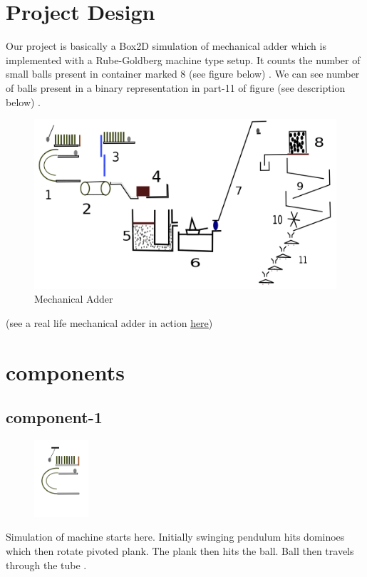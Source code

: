 \documentclass{article}
\begin{document}
\section{Project Design}
Our project is basically a Box2D simulation of mechanical adder which is implemented with a Rube-Goldberg machine type setup. It counts the number of small balls present in container marked 8 (see figure below) . We can see number of balls present in a binary representation in part-11 of figure (see description below) .
\begin{figure}[h]
  \begin{center}
    \includegraphics[width=1\textwidth]{projectfinalfinal}
  \end{center}
  \caption{Mechanical Adder}
\end{figure}

(see a real life mechanical adder in action \href{https://www.youtube.com/watch?v=GcDshWmhF4A}{here}\cite{youtube})

\newpage

\section{components}

\subsection{component-1}

\begin{figure}
    \centering
    \vspace{-20pt}
    \includegraphics[width=0.18\textwidth]{newp1}
\end{figure}
Simulation of machine starts here. Initially swinging pendulum hits dominoes
which then rotate pivoted plank. The plank then hits the ball. 
Ball then travels through the tube .
\end{document}
